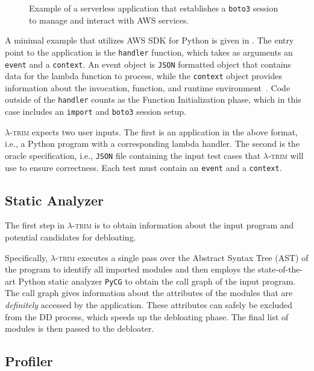 \documentclass[sigplan,nonacm]{acmart}
\newcommand{\sys}{\textsc{\ensuremath{\lambda}-trim}\xspace}
\newcounter{example}
\begin{document}
\begin{figure}
    \centering
    \inputminted[fontsize=\scriptsize]{python}{chapters/design/handler.py}
    \caption{Example of a serverless application that establishes a \texttt{boto3} session to manage and interact with AWS services.}
    \label{fig:handler}
\end{figure}

A minimal example that utilizes AWS SDK for Python is given in .
The entry point to the application is the \texttt{handler} function, which takes as arguments an \texttt{event} and a \texttt{context}.
An event object is \texttt{JSON} formatted object that contains data for the lambda function to process, while the \texttt{context} object provides information about the invocation, function, and runtime environment~\cite{lambdaHandler}.
Code outside of the \texttt{handler} counts as the Function Initialization phase, which in this case includes an \texttt{import} and \texttt{boto3} session setup.

\sys expects two user inputs.
The first is an application in the above format, i.e., a Python program with a corresponding lambda handler.
The second is the oracle specification, i.e., \texttt{JSON} file containing the input test cases that \sys will use to ensure correctness.
Each test must contain an \texttt{event} and a \texttt{context}.

\subsection{Static Analyzer}\label{sec:static}

The first step in \sys is to obtain information about the input program and potential candidates for debloating.

Specifically, \sys executes a single pass over the Abstract Syntax Tree (AST) of the program to identify all imported modules and then employs the state-of-the-art Python static analyzer \texttt{PyCG} \cite{pycg2021} to obtain the call graph of the input program.
The call graph gives information about the attributes of the modules that are \textit{definitely} accessed by the application.
These attributes can safely be excluded from the DD process, which speeds up the debloating phase.
The final list of modules is then passed to the debloater.

 

\subsection{Profiler}\label{sec:profile}
\end{document}
